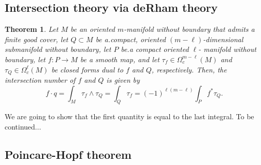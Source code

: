 \documentclass[12pt]{amsart}
\newtheorem{theorem}{Theorem}
\theoremstyle{remark}
\begin{document}
\subsection{Intersection theory via deRham theory}
\begin{theorem}
Let $M$ be an oriented $m$-manifold without boundary that admits a finite good cover, let $Q\subset M$ be a.compact, oriented $(m-\ell)$-dimensional submanifold without boundary, let $P$ be.a compact oriented $\ell$- manifold without boundary, let $f:P\to M$ be a smooth map, and let $\tau_f\in \Omega_c^{m-\ell}(M)$ and $\tau_Q\in \Omega_c^{\ell}(M)$ be closed forms dual to $f$ and $Q$, respectively. Then, the intersection number of $f$ and $Q$ is given by
$$f\cdot q=\int_M \tau_f\wedge\tau_Q=\int_Q \tau_f=(-1)^{\ell(m-\ell)}\int_P f^*\tau_Q.$$ 
\end{theorem}
We are going to show that the first quantity is equal to the last integral. To be continued...

\subsection{Poincare-Hopf theorem}
\end{document}
